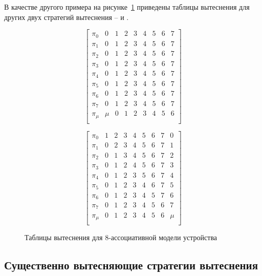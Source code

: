 В качестве другого примера на рисунке~\ref{fig:fifo_mru_tables} приведены таблицы вытеснения для других двух стратегий вытеснения -- \FIFO и \MRU.

\begin{figure}[h] \centering
\parbox{0.4\textwidth}{
$$ \left[
     \begin{array}{c|cccccccc}
       \pi_0 & 0 & 1 & 2 & 3 & 4 & 5 & 6 & 7 \\
       \pi_1 & 0 & 1 & 2 & 3 & 4 & 5 & 6 & 7 \\
       \pi_2 & 0 & 1 & 2 & 3 & 4 & 5 & 6 & 7 \\
       \pi_3 & 0 & 1 & 2 & 3 & 4 & 5 & 6 & 7 \\
       \pi_4 & 0 & 1 & 2 & 3 & 4 & 5 & 6 & 7 \\
       \pi_5 & 0 & 1 & 2 & 3 & 4 & 5 & 6 & 7 \\
       \pi_6 & 0 & 1 & 2 & 3 & 4 & 5 & 6 & 7 \\
       \pi_7 & 0 & 1 & 2 & 3 & 4 & 5 & 6 & 7 \\
       \pi_{\mu} & \mu & 0 & 1 & 2 & 3 & 4 & 5 & 6 \\
     \end{array}
   \right]$$
\center \FIFO} \qquad
\parbox{0.4\textwidth}{
$$ \left[
     \begin{array}{c|cccccccc}
       \pi_0 & 1 & 2 & 3 & 4 & 5 & 6 & 7 & 0 \\
       \pi_1 & 0 & 2 & 3 & 4 & 5 & 6 & 7 & 1 \\
       \pi_2 & 0 & 1 & 3 & 4 & 5 & 6 & 7 & 2 \\
       \pi_3 & 0 & 1 & 2 & 4 & 5 & 6 & 7 & 3 \\
       \pi_4 & 0 & 1 & 2 & 3 & 5 & 6 & 7 & 4 \\
       \pi_5 & 0 & 1 & 2 & 3 & 4 & 6 & 7 & 5 \\
       \pi_6 & 0 & 1 & 2 & 3 & 4 & 5 & 7 & 6 \\
       \pi_7 & 0 & 1 & 2 & 3 & 4 & 5 & 6 & 7 \\
       \pi_{\mu} & 0 & 1 & 2 & 3 & 4 & 5 & 6 & \mu \\
     \end{array}
   \right]$$
\center \MRU } \caption{Таблицы вытеснения для 8-ассоциативной модели устройства}\label{fig:fifo_mru_tables}
\end{figure}

\subsection{Существенно вытесняющие стратегии вытеснения}\label{sec:essentially_displacing}

